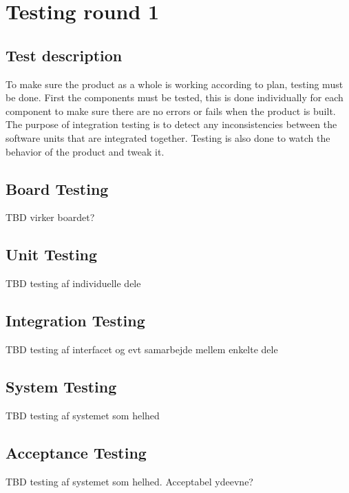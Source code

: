 \section{Testing round 1}

\subsection{Test description}
To make sure the product as a whole is working according to plan, testing must be done. First the components must be tested, this is done individually for each component to make sure there are no errors or fails when the product is built. The purpose of integration testing is to detect any inconsistencies between the software units that are integrated together. Testing is also done to watch the behavior of the product and tweak it.

\subsection{Board Testing}
TBD virker boardet?

\subsection{Unit Testing}
TBD testing af individuelle dele

\subsection{Integration Testing}
TBD testing af interfacet og evt samarbejde mellem enkelte dele

\subsection{System Testing}
TBD testing af systemet som helhed

\subsection{Acceptance Testing}
TBD testing af systemet som helhed. Acceptabel ydeevne?






